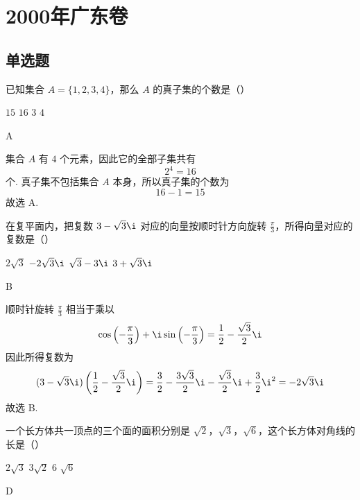 \chapter{2000年广东卷}
\section{单选题}
\begin{problem}
已知集合 \(A = \{1, 2, 3, 4\}\)，那么 \(A\) 的真子集的个数是（\quad）

\choices
    {\(15\)}
    {\(16\)}
    {\(3\)}
    {\(4\)}
\end{problem}

\begin{answer}
A
\end{answer}

\begin{solution}
集合 \(A\) 有 \(4\) 个元素，因此它的全部子集共有
\[
2^{4}=16
\]
个. 真子集不包括集合 \(A\) 本身，所以真子集的个数为
\[
16-1=15
\]
故选 A.
\end{solution}

\begin{problem}
在复平面内，把复数 \(3 - \sqrt{3}\i\) 对应的向量按顺时针方向旋转 \(\frac{\pi}{3}\)，所得向量对应的复数是（\quad）

\choices
    {\(2\sqrt{3}\)}
    {\(-2\sqrt{3}\i\)}
    {\(\sqrt{3} - 3\i\)}
    {\(3 + \sqrt{3}\i\)}
\end{problem}

\begin{answer}
B
\end{answer}

\begin{solution}
顺时针旋转 \(\frac{\pi}{3}\) 相当于乘以
\[
\cos\left(-\frac{\pi}{3}\right)+\i\sin\left(-\frac{\pi}{3}\right)
=\frac12-\frac{\sqrt{3}}2\i
\]
因此所得复数为
\[
(3-\sqrt{3}\i)\left(\frac12-\frac{\sqrt{3}}2\i\right)
=\frac32-\frac{3\sqrt{3}}2\i-\frac{\sqrt{3}}2\i+\frac32\i^2
=-2\sqrt{3}\i
\]
故选 B.
\end{solution}

\begin{problem}
一个长方体共一顶点的三个面的面积分别是 \(\sqrt{2}\)，\(\sqrt{3}\)，\(\sqrt{6}\)，这个长方体对角线的长是（\quad）

\choices
    {\(2 \sqrt{3}\)}
    {\(3\sqrt{2}\)}
    {\(6\)}
    {\(\sqrt{6}\)}
\end{problem}

\begin{answer}
D
\end{answer}

